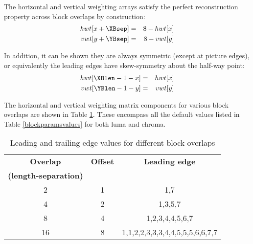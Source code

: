 \begin{informative}
The horizontal and vertical weighting arrays satisfy the perfect reconstruction property across block overlaps by construction:
\begin{eqnarray*}
hwt[x+\XBsep] & = & 8 - hwt[x] \\ 
vwt[y+\YBsep] & = & 8 - vwt[y]  
\end{eqnarray*}

In addition, it can be shown they are always symmetric (except at picture edges), or
equivalently the leading edges have skew-symmetry about the half-way point:
\begin{eqnarray*}
hwt[\XBlen-1-x] & =  & hwt[x] \\
vwt[\YBlen-1-y] & = & vwt[y] 
\end{eqnarray*}

The horizontal and vertical weighting matrix components for various block
 overlaps are shown in Table \ref{table:leadingedges}. 
These encompass all the default values listed 
in Table \ref{blockparamsvalues} for both luma and chroma.
\end{informative}
\begin{table}[!ht]
\centering
\begin{tabular}{|c|c|c|}
\hline
\rowcolor[gray]{0.75}\bf{Overlap}  & \bf{Offset} & \bf{Leading edge} \\
\rowcolor[gray]{0.75}\bf{(length-separation)} & & \\
\hline
2 & 1 & 1,7\\
\hline
4 & 2 & 1,3,5,7\\
\hline
8 & 4 & 1,2,3,4,4,5,6,7\\
\hline
16 & 8 & 1,1,2,2,3,3,3,4,4,5,5,5,6,6,7,7 \\
\hline
\end{tabular}
\caption{Leading and trailing edge values for different block overlaps}
\label{table:leadingedges}
\end{table}

